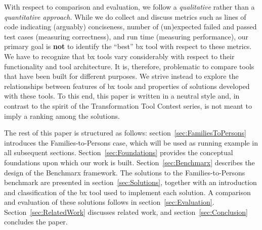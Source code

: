 With respect to comparison and evaluation, we follow a \emph{qualitative} rather than a \emph{quantitative approach}. 
While we do collect and discuss metrics such as lines of code indicating (arguably) conciseness, number of (un)expected failed and passed test cases (measuring correctness), and run time (measuring performance), our primary goal is \textbf{not} to identify the ``best'' bx tool with respect to these metrics. 
We have to recognize that bx tools vary considerably with respect to their functionality and tool architecture. 
It is, therefore, problematic to compare tools that have been built for different purposes. 
We strive instead to explore the relationships between features of bx tools and properties of solutions developed with these tools. 
%
To this end, this paper is written in a neutral style and, in contrast to the spirit of the Transformation Tool Contest series, is not meant to imply a ranking among the solutions. 

The rest of this paper is structured as follows: section~\ref{sec:FamiliesToPersons} introduces the Families-to-Persons case, which will be used as running example in all subsequent sections. 
Section~\ref{sec:Foundations} provides the conceptual foundations upon which our work is built. 
Section~\ref{sec:Benchmarx} describes the design of the Benchmarx framework. 
The solutions to the Families-to-Persons benchmark are presented in section~\ref{sec:Solutions}, together with an introduction and classification of the bx tool used to implement each solution. 
A comparison and evaluation of these solutions follows in section~\ref{sec:Evaluation}. 
Section~\ref{sec:RelatedWork} discusses related work, and section~\ref{sec:Conclusion} concludes the paper.